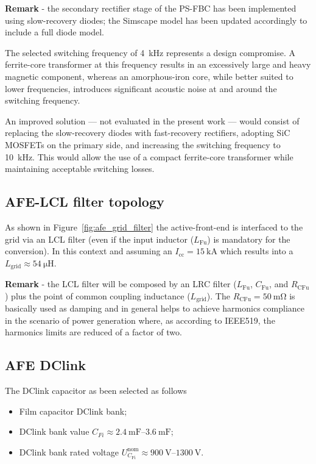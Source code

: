 \documentclass[11pt,a4paper]{scrartcl}
\begin{document}
\begin{onehalfspace}
\noindent\textbf{Remark} - the secondary rectifier stage of the PS-FBC has been implemented using
slow-recovery diodes; the Simscape model has been updated accordingly to
include a full diode model.

The selected switching frequency of \SI{4}{\kilo\hertz} represents a
design compromise. A ferrite-core transformer at this frequency results
in an excessively large and heavy magnetic component, whereas an
amorphous-iron core, while better suited to lower frequencies, introduces
significant acoustic noise at and around the switching frequency.

An improved solution — not evaluated in the present work — would consist
of replacing the slow-recovery diodes with fast-recovery rectifiers,
adopting SiC MOSFETs on the primary side, and increasing the switching
frequency to \SI{10}{\kilo\hertz}. This would allow the use of a
compact ferrite-core transformer while maintaining acceptable switching
losses.

\subsection{AFE-LCL filter topology}
As shown in Figure~\ref{fig:afe_grid_filter} the active-front-end is interfaced to the grid via an LCL filter (even if the input inductor ($L_\text{Fu}$) is mandatory for the conversion). In this context and assuming an $I_\text{cc}=\SI{15}{\kilo\ampere}$ which results into a $L_\text{grid} \approx\SI{54}{\micro\henry}$.

\noindent\textbf{Remark} - the LCL filter will be composed by an LRC filter ($L_\text{Fu}$, $C_\text{Fu}$, and $R_\text{CFu}$) plus the point of common coupling inductance ($L_\text{grid}$).
The $R_\text{CFu} = \SI{50}{\milli\ohm}$ is basically used as damping and in general helps to achieve harmonics compliance in the scenario of power generation where, as according to IEEE519, the harmonics limits are reduced of a factor of two.

\subsection{AFE DClink}
The DClink capacitor as been selected as follows
\begin{itemize}
	\item[--] Film capacitor DClink bank;
	\item[--] DClink bank value $C_{Fi} \approx \SI{2.4}{\milli\farad}–\SI{3.6}{\milli\farad}$;	
	\item[--] DClink bank rated voltage $U_{C_\text{Fi}}^\text{nom} \approx \SI{900}{\volt}–\SI{1300}{\volt}$.
\end{itemize}


\end{onehalfspace}
\end{document}
